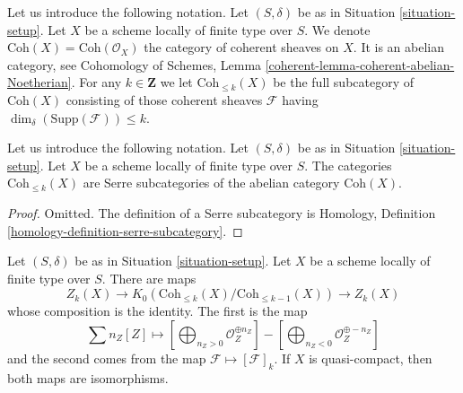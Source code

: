 \medskip\noindent
Let us introduce the following notation.
Let $(S, \delta)$ be as in Situation \ref{situation-setup}.
Let $X$ be a scheme locally of finite type over $S$.
We denote $\text{Coh}(X) = \text{Coh}(\mathcal{O}_X)$
the category of coherent sheaves on $X$.
It is an abelian category, see
Cohomology of Schemes, Lemma \ref{coherent-lemma-coherent-abelian-Noetherian}.
For any $k \in \mathbf{Z}$ we let $\text{Coh}_{\leq k}(X)$
be the full subcategory of $\text{Coh}(X)$
consisting of those coherent sheaves $\mathcal{F}$
having $\dim_\delta(\text{Supp}(\mathcal{F})) \leq k$.

\begin{lemma}
\label{lemma-Serre-subcategories}
Let us introduce the following notation.
Let $(S, \delta)$ be as in Situation \ref{situation-setup}.
Let $X$ be a scheme locally of finite type over $S$.
The categories $\text{Coh}_{\leq k}(X)$ are Serre subcategories
of the abelian category $\text{Coh}(X)$.
\end{lemma}

\begin{proof}
Omitted. The definition of a Serre subcategory is
Homology, Definition \ref{homology-definition-serre-subcategory}.
\end{proof}

\begin{lemma}
\label{lemma-cycles-k-group}
Let $(S, \delta)$ be as in Situation \ref{situation-setup}.
Let $X$ be a scheme locally of finite type over $S$.
There are maps
$$
Z_k(X)
\longrightarrow
K_0(\text{Coh}_{\leq k}(X)/\text{Coh}_{\leq k - 1}(X))
\longrightarrow
Z_k(X)
$$
whose composition is the identity. The first is the map
$$
\sum n_Z[Z] \mapsto
\left[\bigoplus\nolimits_{n_Z > 0} \mathcal{O}_Z^{\oplus n_Z}\right]
-
\left[\bigoplus\nolimits_{n_Z < 0} \mathcal{O}_Z^{\oplus -n_Z}\right]
$$
and the second comes from the map $\mathcal{F} \mapsto [\mathcal{F}]_k$.
If $X$ is quasi-compact, then both maps are isomorphisms.
\end{lemma}

